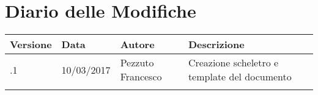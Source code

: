 \section*{Diario delle Modifiche}
\begin{longtabu} to \textwidth {
	X[4,l,p]
	X[4,l,p]
	X[4,l,p]
	X[8,l,p]}
	\toprule
		 Versione & Data & Autore & Descrizione \\
		\midrule
		\endhead

		\addlinespace[0.2em]
		\midrule
		.1 & 10/03/2017 & Pezzuto Francesco & Creazione scheletro e template del documento\\
		\addlinespace[0.4em]
		
	\bottomrule
\end{longtabu}